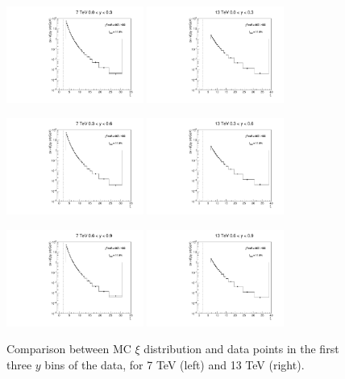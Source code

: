 \documentclass{article}
\begin{document}
\begin{figure}[h!]
\centering
\includegraphics[width = 0.4\textwidth]{xi_7_y1.pdf}
\includegraphics[width = 0.4\textwidth]{xi_13_y1.pdf}

\includegraphics[width = 0.4\textwidth]{xi_7_y2.pdf}
\includegraphics[width = 0.4\textwidth]{xi_13_y2.pdf}

\includegraphics[width = 0.4\textwidth]{xi_7_y3.pdf}
\includegraphics[width = 0.4\textwidth]{xi_13_y3.pdf}
\caption{Comparison between MC $\xi$ distribution and data points in the first three $y$ bins of the data, for 7 TeV (left) and 13 TeV (right).}\label{f:xi_comp_1}
\end{figure}
\end{document}
